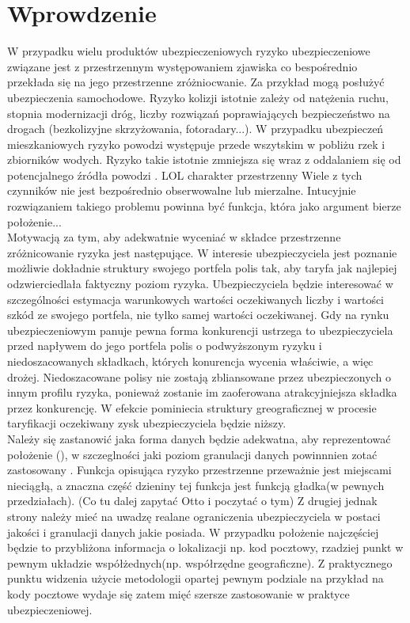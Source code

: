 \documentclass[polish, twoside, 12pt, a4paper]{article}
\theoremstyle{definition}
\theoremstyle{plain}
\theoremstyle{remark}
\begin{document}
\cleardoublepage
\section{Wprowdzenie}
W przypadku wielu produktów ubezpieczeniowych ryzyko ubezpieczeniowe związane jest z przestrzennym występowaniem zjawiska co bespośrednio przekłada się na jego przestrzenne zróżniocwanie. Za przykład mogą posłużyć ubezpieczenia samochodowe. Ryzyko kolizji istotnie zależy od natężenia ruchu, stopnia modernizacji dróg, liczby rozwiązań poprawiających bezpieczeństwo na drogach (bezkolizyjne skrzyżowania, fotoradary...). W przypadku ubezpieczeń mieszkaniowych ryzyko powodzi występuje przede wszytskim w pobliżu rzek i zbiorników wodych. Ryzyko takie istotnie zmniejsza się wraz z oddalaniem się od potencjalnego źródła powodzi . LOL charakter przestrzenny Wiele z tych czynników nie jest bezpośrednio obserwowalne lub mierzalne. Intucyjnie rozwiązaniem takiego problemu powinna być funkcja, która jako argument bierze położenie... \\

Motywacją za tym, aby adekwatnie wyceniać w składce przestrzenne zróżnicowanie ryzyka jest następujące. W interesie ubezpieczyciela jest poznanie możliwie dokładnie struktury swojego portfela polis tak, aby taryfa jak najlepiej odzwierciedlała faktyczny poziom ryzyka. Ubezpieczyciela będzie interesować w szczególności estymacja warunkowych wartości oczekiwanych liczby i wartości szkód ze swojego portfela, nie tylko samej wartości oczekiwanej. Gdy na rynku ubezpieczeniowym panuje pewna forma konkurencji ustrzega to ubezpieczyciela przed napływem do jego portfela polis o podwyższonym ryzyku i niedoszacowanych składkach, których konurencja wycenia właściwie, a więc drożej. Niedoszacowane polisy nie zostają zbliansowane przez ubezpieczonych o innym profilu ryzyka, ponieważ zostanie im zaoferowana atrakcyjniejsza składka przez konkurencję. W efekcie pominiecia struktury greograficznej w procesie taryfikacji oczekiwany zysk ubezpieczyciela będzie niższy. \\



Należy się zastanowić jaka forma danych będzie adekwatna, aby reprezentować położenie (), w szczeglności jaki poziom granulacji danych powinnnien zotać zastosowany . Funkcja opisująca ryzyko przestrzenne przeważnie jest miejscami nieciągłą, a znaczna część dzieniny tej funkcja jest funkcją gładka(w pewnych przedziałach). (Co tu dalej zapytać Otto i poczytać o tym)
Z drugiej jednak strony należy mieć na uwadzę realane ograniczenia ubezpieczyciela w postaci  jakości i granulacji danych jakie posiada. W przypadku położenie najczęściej będzie to przybliżona informacja o lokalizacji np. kod pocztowy, rzadziej punkt w pewnym układzie współżednych(np. współrzędne geograficzne). Z praktycznego punktu widzenia użycie metodologii opartej pewnym podziale na przykład na kody pocztowe wydaje się zatem mięć szersze zastosowanie w praktyce ubezpieczeniowej. \\
\end{document}
